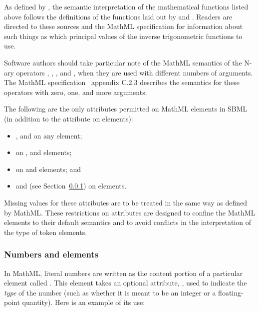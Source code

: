 As defined by \mathmltwo, the semantic interpretation of the
mathematical functions listed above follows the definitions of the
functions laid out by \cite{abramowitz:1997} and
\cite{zwillinger:1988}.  Readers are directed to these sources and
the MathML specification for information about such things as
which principal values of the inverse trigonometric functions to
use.

Software authors should take particular note of the MathML
semantics of the N-ary operators , ,
,  and , when they are used with
different numbers of arguments.  The MathML
specification~\citep{w3c:2000b} appendix C.2.3 describes the
semantics for these operators with zero, one, and more arguments.

The following are the only attributes permitted on MathML elements
in SBML (in addition to the  attribute on
 elements):
\begin{itemize}\setlength{\parskip}{-0.2ex}

\item {},  and  on any element;

\item {} on ,
     and  elements;

\item {} on 
    and  elements; and

\item {} and 
  (see Section~\ref{sec:cn-token}) on  elements.

\end{itemize}\vspace*{-0.75ex}
Missing values for these attributes are to be treated in the same
way as defined by MathML.  These restrictions on attributes are
designed to confine the MathML elements to their default semantics
and to avoid conflicts in the interpretation of the type of token
elements.


\subsubsection{Numbers and  elements}
\label{sec:cn-token}
\label{sec:mathml-value-space}

In MathML, literal numbers are written as the content portion of a
particular element called .  This element takes an
optional attribute, , used to indicate the \emph{type}
of the number (such as whether it is meant to be an integer or a
floating-point quantity).  Here is an example of its use:

